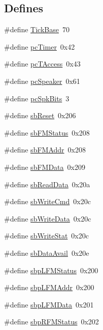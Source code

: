 \subsection*{Defines}
\begin{DoxyCompactItemize}
\item 
\#define \hyperlink{ID__SD_8H_aa048ddfc54294d841b77b862a90c7604}{TickBase}~70
\item 
\#define \hyperlink{ID__SD_8H_aa0f8cc99f80c058f4ceef45b6f23c5a6}{pcTimer}~0x42
\item 
\#define \hyperlink{ID__SD_8H_ad3e4d7b38e1386a68d1426769f3d7bcd}{pcTAccess}~0x43
\item 
\#define \hyperlink{ID__SD_8H_a0f6a26797bb04f9d200f8dd63d22e246}{pcSpeaker}~0x61
\item 
\#define \hyperlink{ID__SD_8H_a06cfe8cf4ec5a2eab34456123e5fd8eb}{pcSpkBits}~3
\item 
\#define \hyperlink{ID__SD_8H_a186278d36eb24b67a1a307ff2a73bd38}{sbReset}~0x206
\item 
\#define \hyperlink{ID__SD_8H_aeea108ffaf287365e845415899b1a752}{sbFMStatus}~0x208
\item 
\#define \hyperlink{ID__SD_8H_a28e5c9981f7c2100c48b14100f260fc2}{sbFMAddr}~0x208
\item 
\#define \hyperlink{ID__SD_8H_af62d9e895eedfee0a282496a66436405}{sbFMData}~0x209
\item 
\#define \hyperlink{ID__SD_8H_a7c06c45ded9204942f90510dba4545d2}{sbReadData}~0x20a
\item 
\#define \hyperlink{ID__SD_8H_aea5f79e9960d9dc0fa4d97c176a315c9}{sbWriteCmd}~0x20c
\item 
\#define \hyperlink{ID__SD_8H_aec3a60f3b7cd1d21b6d847fcf2f5e1ef}{sbWriteData}~0x20c
\item 
\#define \hyperlink{ID__SD_8H_a4fa4fcb36c5f0122d3fed217239bcfa1}{sbWriteStat}~0x20c
\item 
\#define \hyperlink{ID__SD_8H_a7a85599c5d8c058c132cb9dde94829e1}{sbDataAvail}~0x20e
\item 
\#define \hyperlink{ID__SD_8H_aff856bac87f5e395de226f22b30d8083}{sbpLFMStatus}~0x200
\item 
\#define \hyperlink{ID__SD_8H_a687e8ff130ea2a2fbbe7657d98c3efeb}{sbpLFMAddr}~0x200
\item 
\#define \hyperlink{ID__SD_8H_a980d513248ac1e5a98122b1571a36941}{sbpLFMData}~0x201
\item 
\#define \hyperlink{ID__SD_8H_a3921b7893d75d2bf4bdeacdd0c1d14ea}{sbpRFMStatus}~0x202
\item 

\end{DoxyCompactItemize}
